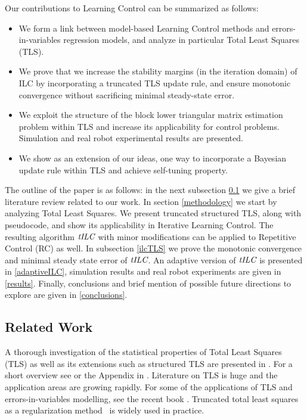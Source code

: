 Our contributions to Learning Control can be summarized as follows:

\begin{itemize}
\item We form a link between model-based Learning Control methods and errors-in-variables regression models, and analyze in particular Total Least Squares (TLS).
\item We prove that we increase the stability margins (in the iteration domain) of ILC by incorporating a truncated TLS update rule, and ensure monotonic convergence without sacrificing minimal steady-state error. 
\item We exploit the structure of the block lower triangular matrix estimation problem within TLS and increase its applicability for control problems. Simulation and real robot experimental results are presented.
\item We show as an extension of our ideas, one way to incorporate a Bayesian update rule within TLS and achieve self-tuning property. 
\end{itemize}

The outline of the paper is as follows: in the next subsection \ref{relatedWork} we give a brief literature review related to our work. In section \ref{methodology} we start by analyzing Total Least Squares. We present truncated structured TLS, along with pseudocode, and show its applicability in Iterative Learning Control. The resulting algorithm $\emph{tILC}$ with minor modifications can be applied to Repetitive Control (RC) as well. In subsection \ref{ilcTLS} we prove the monotonic convergence and minimal steady state error of $\emph{tILC}$. An adaptive version of $\emph{tILC}$ is presented in \ref{adaptiveILC}, simulation results and real robot experiments are given in \ref{results}. Finally, conclusions and brief mention of possible future directions to explore are given in \ref{conclusions}.

\subsection{Related Work}\label{relatedWork}

A thorough investigation of the statistical properties of Total Least Squares (TLS) as well as its extensions such as structured TLS are presented in \cite{VanHuffel91}. For a short overview see \cite{Golub80} or the Appendix in \cite{Golub96}. Literature on TLS is huge and the application areas are growing rapidly. For some of the applications of TLS and errors-in-variables modelling, see the recent book \cite{VanHuffel13}. Truncated total least squares as a regularization method~\cite{Fierro97} is widely used in practice. %


